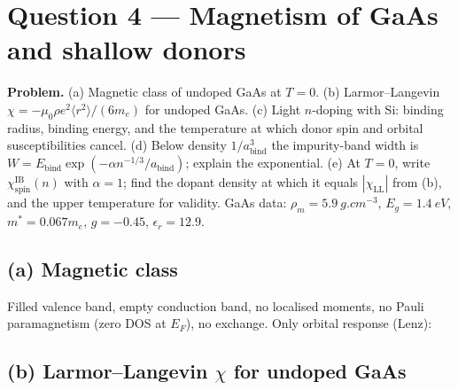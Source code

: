 \documentclass[11pt]{article}
\begin{document}
\section*{Question 4 --- Magnetism of GaAs and shallow donors}

\textbf{Problem.} (a) Magnetic class of undoped GaAs at $T=0$. (b) Larmor--Langevin $\chi=-\mu_0\rho e^2\langle r^2\rangle/(6 m_e)$ for undoped GaAs. (c) Light $n$-doping with Si: binding radius, binding energy, and the temperature at which donor spin and orbital susceptibilities cancel. (d) Below density $1/a_{\text{bind}}^3$ the impurity-band width is $W=E_{\text{bind}}\exp(-\alpha n^{-1/3}/a_{\text{bind}})$; explain the exponential. (e) At $T=0$, write $\chi_{\text{spin}}^{\text{IB}}(n)$ with $\alpha=1$; find the dopant density at which it equals $|\chi_{\text{LL}}|$ from (b), and the upper temperature for validity. GaAs data: $\rho_m=\SI{5.9}{g.cm^{-3}}$, $E_g=\SI{1.4}{eV}$, $m^*=0.067 m_e$, $g=-0.45$, $\epsilon_r=12.9$.

\subsection*{(a) Magnetic class}

Filled valence band, empty conduction band, no localised moments, no Pauli paramagnetism (zero DOS at $E_F$), no exchange. Only orbital response (Lenz):

\subsection*{(b) Larmor--Langevin $\chi$ for undoped GaAs}
\end{document}
